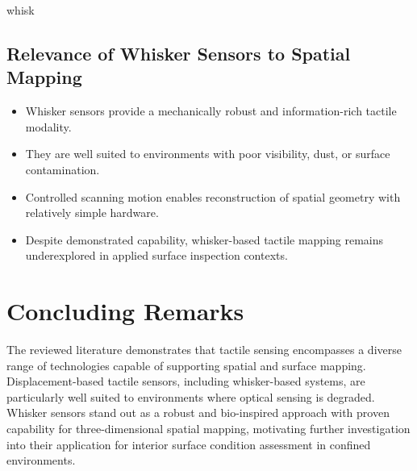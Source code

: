 whisk\documentclass[11pt,a4paper]{article}
\begin{document}
\subsection{Relevance of Whisker Sensors to Spatial Mapping}

\begin{itemize}
    \item Whisker sensors provide a mechanically robust and information-rich tactile modality.
    \item They are well suited to environments with poor visibility, dust, or surface contamination.
    \item Controlled scanning motion enables reconstruction of spatial geometry with relatively simple hardware.
    \item Despite demonstrated capability, whisker-based tactile mapping remains underexplored in applied surface inspection contexts.
\end{itemize}

\section{Concluding Remarks}

The reviewed literature demonstrates that tactile sensing encompasses a diverse range of technologies capable of supporting spatial and surface mapping. Displacement-based tactile sensors, including whisker-based systems, are particularly well suited to environments where optical sensing is degraded. Whisker sensors stand out as a robust and bio-inspired approach with proven capability for three-dimensional spatial mapping, motivating further investigation into their application for interior surface condition assessment in confined environments.
\end{document}
